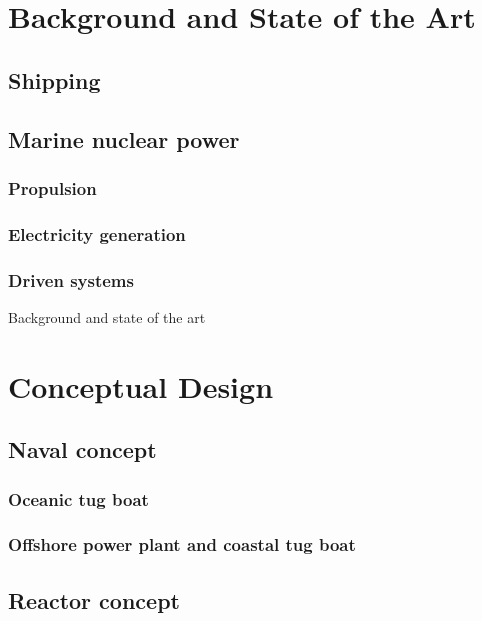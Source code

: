 \documentclass[12pt]{article}
\begin{document}
%
%
%
%
%
%
%
%
%
%
%

\section{Background and State of the Art}
\subsection{Shipping}
\subsection{Marine nuclear power}
\subsubsection{Propulsion}
\subsubsection{Electricity generation}
\subsubsection{Driven systems}
Background and state of the art
\section{Conceptual Design}
\subsection{Naval concept}
\subsubsection{Oceanic tug boat}
\subsubsection{Offshore power plant and coastal tug boat}
\subsection{Reactor concept}
\end{document}
